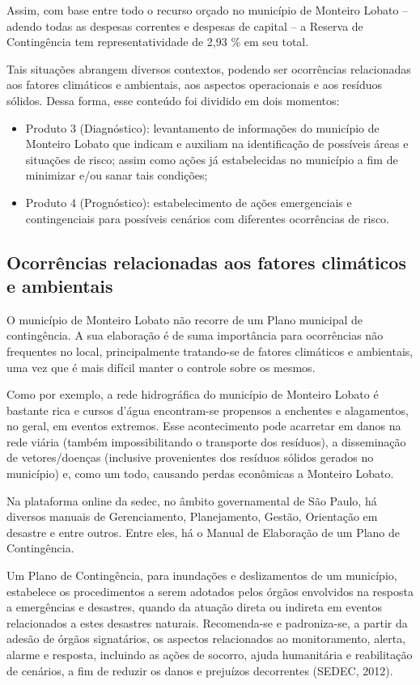 		
		
Assim, com base entre todo o recurso orçado no município de Monteiro Lobato – adendo todas as despesas correntes e despesas de capital – a Reserva de Contingência tem representatividade de 2,93 \% em seu total.

Tais situações abrangem diversos contextos, podendo ser ocorrências relacionadas aos fatores climáticos e ambientais, aos aspectos operacionais e aos resíduos sólidos. Dessa forma, esse conteúdo foi dividido em dois momentos:
\begin{itemize}
	\item Produto 3 (Diagnóstico): levantamento de informações do município de Monteiro Lobato que indicam e auxiliam na identificação de possíveis áreas e situações de risco; assim como ações já estabelecidas no município a fim de minimizar e/ou sanar tais condições;
	\item Produto 4 (Prognóstico): estabelecimento de ações emergenciais e contingenciais para possíveis cenários com diferentes ocorrências de risco.
\end{itemize}

	\subsection{Ocorrências relacionadas aos fatores climáticos e ambientais}
	O município de Monteiro Lobato não recorre de um Plano municipal de contingência. A sua elaboração é de suma importância para ocorrências não frequentes no local, principalmente tratando-se de fatores climáticos e ambientais, uma vez que é mais difícil manter o controle sobre os mesmos.

	Como por exemplo, a rede hidrográfica do município de Monteiro Lobato é bastante rica e cursos d’água encontram-se propensos a enchentes e alagamentos, no geral, em eventos extremos. Esse acontecimento pode acarretar em danos na rede viária (também impossibilitando o transporte dos resíduos), a disseminação de vetores/doenças (inclusive provenientes dos resíduos sólidos gerados no município) e, como um todo, causando perdas econômicas a Monteiro Lobato.

	Na plataforma online da \gls{sedec}, no âmbito governamental de São Paulo, há diversos manuais de Gerenciamento, Planejamento, Gestão, Orientação em desastre e entre outros. Entre eles, há o Manual de Elaboração de um Plano de Contingência. 

	Um Plano de Contingência, para inundações e deslizamentos de um município, estabelece os procedimentos a serem adotados pelos órgãos envolvidos na resposta a emergências e desastres, quando da atuação direta ou indireta em eventos relacionados a estes desastres naturais. Recomenda-se e padroniza-se, a partir da adesão de   órgãos signatários, os aspectos relacionados ao monitoramento, alerta, alarme e resposta, incluindo as ações de socorro, ajuda humanitária e reabilitação de cenários, a fim de reduzir os danos e prejuízos decorrentes (SEDEC, 2012).

